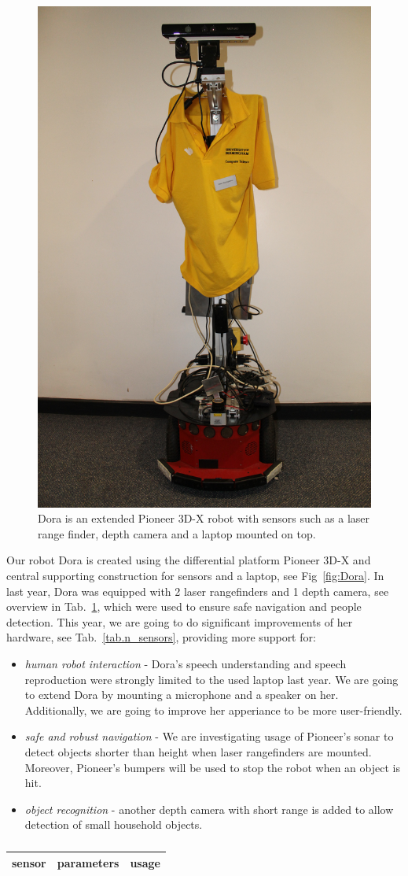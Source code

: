 \begin{figure}[!t]
\centering
\includegraphics[width=2.in]{dora_new.png}
\caption{Dora is an extended Pioneer 3D-X robot with sensors such as a laser range finder, depth camera and a laptop mounted on top.}
\label{fig:dora}
\end{figure}

Our robot Dora is created using the differential platform Pioneer 3D-X and central supporting construction for sensors and a laptop, see Fig~\ref{fig:Dora}. 
In last year, Dora was equipped with 2 laser rangefinders and 1 depth camera, see overview in Tab.~\ref{tab:c_sensors}, which were used to ensure safe navigation 
and people detection. 
This year, we are going to do significant improvements of her hardware, see Tab.~\ref{tab.n_sensors}, providing more support for:
\begin{itemize}
\item \textit{human robot interaction} - Dora's speech understanding and speech reproduction were strongly limited to the used laptop last year. 
We are going to extend Dora by mounting a microphone and a speaker on her. Additionally, we are going to improve her apperiance to be more user-friendly. 
\item \textit{safe and robust navigation} - We are investigating usage of Pioneer's sonar to detect objects shorter than height when laser rangefinders are mounted. 
Moreover, Pioneer's bumpers will be used to stop the robot when an object is hit. 
\item \textit{object recognition} - another depth camera with short range is added to allow detection of small household objects.
\end{itemize}
  

\begin{table}
\begin{tabular}{lll}
\hline
sensor & parameters & usage\\
\hline
\hline



\end{tabular}
\caption{\label{tab:c_sensors}}
\end{table}




